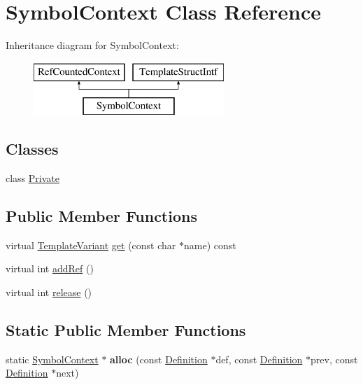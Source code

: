 \hypertarget{class_symbol_context}{}\section{Symbol\+Context Class Reference}
\label{class_symbol_context}
Inheritance diagram for Symbol\+Context\+:\begin{figure}[H]
\begin{center}
\leavevmode
\includegraphics[height=2.000000cm]{class_symbol_context}
\end{center}
\end{figure}
\subsection*{Classes}
\begin{DoxyCompactItemize}
\item 
class \mbox{\hyperlink{class_symbol_context_1_1_private}{Private}}
\end{DoxyCompactItemize}
\subsection*{Public Member Functions}
\begin{DoxyCompactItemize}
\item 
virtual \mbox{\hyperlink{class_template_variant}{Template\+Variant}} \mbox{\hyperlink{class_symbol_context_a109b5825564a5f59bb84905c8eb9990f}{get}} (const char $\ast$name) const
\item 
virtual int \mbox{\hyperlink{class_symbol_context_abc94a79c870f23c5581c82fe63f54ace}{add\+Ref}} ()
\item 
virtual int \mbox{\hyperlink{class_symbol_context_ac6ec8d1afe939fc64ac4f43a57220da6}{release}} ()
\end{DoxyCompactItemize}
\subsection*{Static Public Member Functions}
\begin{DoxyCompactItemize}
\item 
\mbox{\label{class_symbol_context_a0267d3f3beb024cf4a8972b7be70107b}} 
static \mbox{\hyperlink{class_symbol_context}{Symbol\+Context}} $\ast$ {\bfseries alloc} (const \mbox{\hyperlink{class_definition}{Definition}} $\ast$def, const \mbox{\hyperlink{class_definition}{Definition}} $\ast$prev, const \mbox{\hyperlink{class_definition}{Definition}} $\ast$next)
\end{DoxyCompactItemize}



